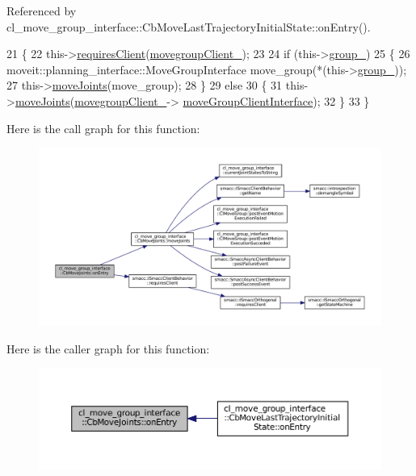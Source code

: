 Referenced by cl\+\_\+move\+\_\+group\+\_\+interface\+::\+Cb\+Move\+Last\+Trajectory\+Initial\+State\+::on\+Entry().


\begin{DoxyCode}
21   \{
22     this->\hyperlink{classsmacc_1_1ISmaccClientBehavior_a32b16e99e3b4cb289414203dc861a440}{requiresClient}(\hyperlink{classcl__move__group__interface_1_1CbMoveJoints_aa5749bbc6bb5f09069e9e8115326f024}{movegroupClient\_});
23 
24     \textcolor{keywordflow}{if} (this->\hyperlink{classcl__move__group__interface_1_1CbMoveJoints_afc75b1e5403e49583930531bcb6508eb}{group\_})
25     \{
26       moveit::planning\_interface::MoveGroupInterface move\_group(*(this->\hyperlink{classcl__move__group__interface_1_1CbMoveJoints_afc75b1e5403e49583930531bcb6508eb}{group\_}));
27       this->\hyperlink{classcl__move__group__interface_1_1CbMoveJoints_ad91d243eb8a818e240d85e5a7fdea68d}{moveJoints}(move\_group);
28     \}
29     \textcolor{keywordflow}{else}
30     \{
31       this->\hyperlink{classcl__move__group__interface_1_1CbMoveJoints_ad91d243eb8a818e240d85e5a7fdea68d}{moveJoints}(\hyperlink{classcl__move__group__interface_1_1CbMoveJoints_aa5749bbc6bb5f09069e9e8115326f024}{movegroupClient\_}->
      \hyperlink{classcl__move__group__interface_1_1ClMoveGroup_a92922ea689e4e1b7b91512c56629c95b}{moveGroupClientInterface});
32     \}
33   \}
\end{DoxyCode}
Here is the call graph for this function\+:
\nopagebreak
\begin{figure}[H]
\begin{center}
\leavevmode
\includegraphics[width=350pt]{classcl__move__group__interface_1_1CbMoveJoints_a23e4181af695aed9fa6bb4ae3f17fd76_cgraph}
\end{center}
\end{figure}
Here is the caller graph for this function\+:
\nopagebreak
\begin{figure}[H]
\begin{center}
\leavevmode
\includegraphics[width=350pt]{classcl__move__group__interface_1_1CbMoveJoints_a23e4181af695aed9fa6bb4ae3f17fd76_icgraph}
\end{center}
\end{figure}
